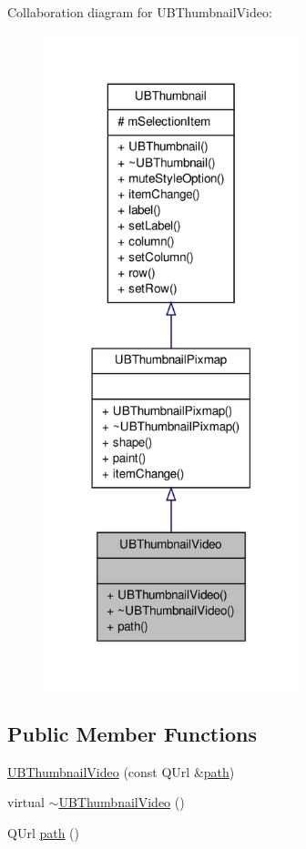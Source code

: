 Collaboration diagram for U\-B\-Thumbnail\-Video\-:
\nopagebreak
\begin{figure}[H]
\begin{center}
\leavevmode
\includegraphics[width=210pt]{d9/d18/class_u_b_thumbnail_video__coll__graph}
\end{center}
\end{figure}
\subsection*{Public Member Functions}
\begin{DoxyCompactItemize}
\item 
\hyperlink{class_u_b_thumbnail_video_af58e97ce31b2ddd790c12d777ee84709}{U\-B\-Thumbnail\-Video} (const Q\-Url \&\hyperlink{class_u_b_thumbnail_video_a81c5439b23d8a4cd9c505c5094638ab8}{path})
\item 
virtual \hyperlink{class_u_b_thumbnail_video_a46d48e79fd74c961a5edba63d56147a5}{$\sim$\-U\-B\-Thumbnail\-Video} ()
\item 
Q\-Url \hyperlink{class_u_b_thumbnail_video_a81c5439b23d8a4cd9c505c5094638ab8}{path} ()
\end{DoxyCompactItemize}
